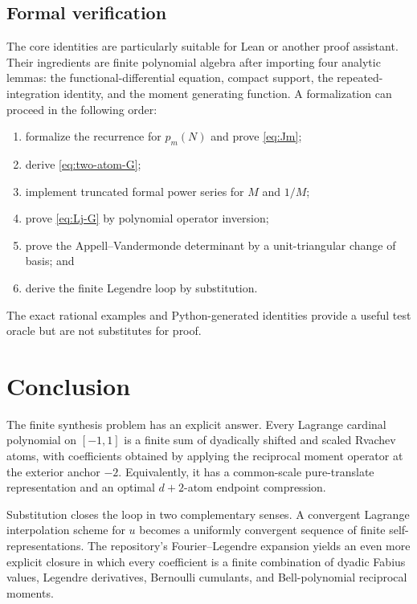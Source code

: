 \documentclass[11pt,oneside]{article}
\theoremstyle{definition}
\theoremstyle{remark}
\begin{document}
\subsection{Formal verification}
The core identities are particularly suitable for Lean or another proof
assistant.  Their ingredients are finite polynomial algebra after importing
four analytic lemmas: the functional-differential equation, compact support,
the repeated-integration identity, and the moment generating function.
A formalization can proceed in the following order:

\begin{enumerate}
\item formalize the recurrence for $p_m(N)$ and prove \eqref{eq:Jm};
\item derive \eqref{eq:two-atom-G};
\item implement truncated formal power series for $M$ and $1/M$;
\item prove \eqref{eq:Lj-G} by polynomial operator inversion;
\item prove the Appell--Vandermonde determinant by a unit-triangular change
of basis; and
\item derive the finite Legendre loop by substitution.
\end{enumerate}

The exact rational examples and Python-generated identities provide a useful
test oracle but are not substitutes for proof.

\section{Conclusion}

The finite synthesis problem has an explicit answer.  Every Lagrange
cardinal polynomial on $[-1,1]$ is a finite sum of dyadically shifted and
scaled Rvachev atoms, with coefficients obtained by applying the reciprocal
moment operator at the exterior anchor $-2$.  Equivalently, it has a
common-scale pure-translate representation and an optimal $d+2$-atom
endpoint compression.

Substitution closes the loop in two complementary senses.  A convergent
Lagrange interpolation scheme for $u$ becomes a uniformly convergent
sequence of finite self-representations.  The repository's
Fourier--Legendre expansion yields an even more explicit closure in which
every coefficient is a finite combination of dyadic Fabius values,
Legendre derivatives, Bernoulli cumulants, and Bell-polynomial reciprocal
moments.
\end{document}
